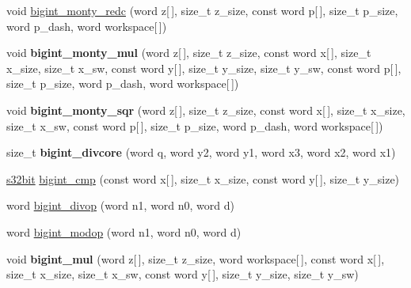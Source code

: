 \begin{DoxyCompactItemize}
\item 
void \hyperlink{namespaceBotan_a42b877251155c5288daecb6173c61c02}{bigint\-\_\-monty\-\_\-redc} (word z\mbox{[}$\,$\mbox{]}, size\-\_\-t z\-\_\-size, const word p\mbox{[}$\,$\mbox{]}, size\-\_\-t p\-\_\-size, word p\-\_\-dash, word workspace\mbox{[}$\,$\mbox{]})
\item 
\hypertarget{namespaceBotan_ad4c86e63aa423ad89607b22e28d98fb5}{void {\bfseries bigint\-\_\-monty\-\_\-mul} (word z\mbox{[}$\,$\mbox{]}, size\-\_\-t z\-\_\-size, const word x\mbox{[}$\,$\mbox{]}, size\-\_\-t x\-\_\-size, size\-\_\-t x\-\_\-sw, const word y\mbox{[}$\,$\mbox{]}, size\-\_\-t y\-\_\-size, size\-\_\-t y\-\_\-sw, const word p\mbox{[}$\,$\mbox{]}, size\-\_\-t p\-\_\-size, word p\-\_\-dash, word workspace\mbox{[}$\,$\mbox{]})}\label{namespaceBotan_ad4c86e63aa423ad89607b22e28d98fb5}

\item 
\hypertarget{namespaceBotan_a4d1e233d87788c253821c25363753200}{void {\bfseries bigint\-\_\-monty\-\_\-sqr} (word z\mbox{[}$\,$\mbox{]}, size\-\_\-t z\-\_\-size, const word x\mbox{[}$\,$\mbox{]}, size\-\_\-t x\-\_\-size, size\-\_\-t x\-\_\-sw, const word p\mbox{[}$\,$\mbox{]}, size\-\_\-t p\-\_\-size, word p\-\_\-dash, word workspace\mbox{[}$\,$\mbox{]})}\label{namespaceBotan_a4d1e233d87788c253821c25363753200}

\item 
\hypertarget{namespaceBotan_ada23a731ed5ad863267c5f71504cecac}{size\-\_\-t {\bfseries bigint\-\_\-divcore} (word q, word y2, word y1, word x3, word x2, word x1)}\label{namespaceBotan_ada23a731ed5ad863267c5f71504cecac}

\item 
\hyperlink{namespaceBotan_a28e03d327abd4d5b1e7091e8d80d5cfe}{s32bit} \hyperlink{namespaceBotan_a327ab217048a628ee858b38b869bb4ac}{bigint\-\_\-cmp} (const word x\mbox{[}$\,$\mbox{]}, size\-\_\-t x\-\_\-size, const word y\mbox{[}$\,$\mbox{]}, size\-\_\-t y\-\_\-size)
\item 
word \hyperlink{namespaceBotan_a02cea0cc0c767a608413ba0cac4e74c4}{bigint\-\_\-divop} (word n1, word n0, word d)
\item 
word \hyperlink{namespaceBotan_acffd94b3a9b524da12c07a88fdda1eb7}{bigint\-\_\-modop} (word n1, word n0, word d)
\item 
\hypertarget{namespaceBotan_a2efb3c3812c0cfb88bf775bdfa7baabf}{void {\bfseries bigint\-\_\-mul} (word z\mbox{[}$\,$\mbox{]}, size\-\_\-t z\-\_\-size, word workspace\mbox{[}$\,$\mbox{]}, const word x\mbox{[}$\,$\mbox{]}, size\-\_\-t x\-\_\-size, size\-\_\-t x\-\_\-sw, const word y\mbox{[}$\,$\mbox{]}, size\-\_\-t y\-\_\-size, size\-\_\-t y\-\_\-sw)}\label{namespaceBotan_a2efb3c3812c0cfb88bf775bdfa7baabf}


\end{DoxyCompactItemize}
